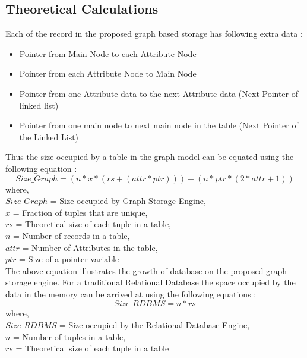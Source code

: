 \documentclass[12pt, oneside]{book}
\begin{document}
\subsection{Theoretical Calculations}
Each of the record in the proposed graph based storage has following extra data :
\begin{itemize}
 \item Pointer from Main Node to each Attribute Node
 \item Pointer from each Attribute Node to Main Node
 \item Pointer from one Attribute data to the next Attribute data (Next Pointer of linked list)
 \item Pointer from one main node to next main node in the table (Next Pointer of the Linked List)
\end{itemize}
Thus the size occupied by a table in the graph model can be equated using the following equation :
\begin{equation}
  Size\_Graph = (n * x * (rs + (attr  * ptr)) ) + (n * ptr * (2 * attr + 1))
  \label{grsize}
\end{equation}
where, \\
$Size\_Graph$ = Size occupied by Graph Storage Engine, \\
$x$ = Fraction of tuples that are unique, \\
$rs$ = Theoretical size of each tuple in a table, \\
$n$ = Number of records in a table, \\
$attr$ = Number of Attributes in the table, \\
$ptr$ = Size of a pointer variable \\

The above equation illustrates the growth of database on the proposed graph storage engine. For a traditional Relational Database the space occupied by the data in the memory can be arrived at using the following equations :
\begin{equation}
 Size\_RDBMS = n * rs
 \label{rdbmssize}
\end{equation}
where, \\
$Size\_RDBMS$ = Size occupied by the Relational Database Engine, \\
$n$ = Number of tuples in a table, \\
$rs$ = Theoretical size of each tuple in a table \\
\end{document}
